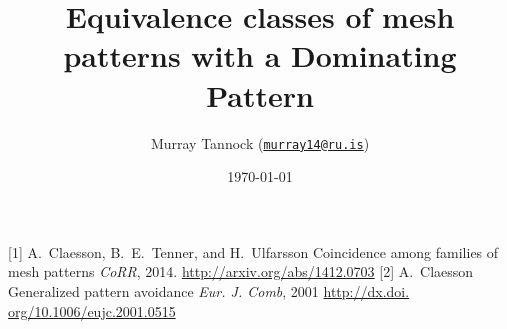 \documentclass[11pt]{beamer}
\title[Dominating Patterns]{Equivalence classes of mesh patterns with a Dominating Pattern}
\author[M.~Tannock]{Murray Tannock (\href{mailto:murray14@ru.is}{\texttt{murray14@ru.is}})}
\institute[Reykjavik University]
{
\texttt{[image: rulogo]}
}
\date{\today}
\begin{document}
  \begin{frame}
    \titlepage
  \end{frame}





\begin{thebibliography}{10}
  [1]
    A.~Claesson, B.~E.~Tenner, and H.~Ulfarsson
    \newblock Coincidence among families of mesh patterns
    \newblock \emph{CoRR}, 2014.
    \url{http://arxiv.org/abs/1412.0703}
  [2]
   A.~Claesson
   \newblock Generalized pattern avoidance
   \newblock \emph{Eur. J. Comb}, 2001
   \url{http://dx.doi. org/10.1006/eujc.2001.0515}
  \end{thebibliography}
\end{document}
